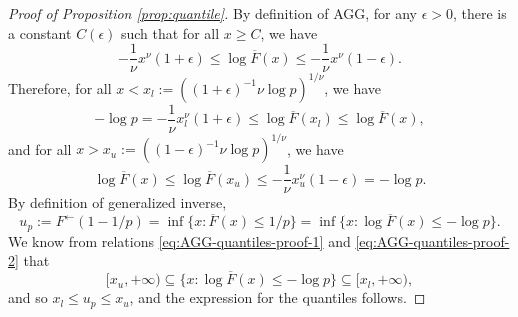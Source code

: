 % 
\begin{proof}[Proof of Proposition \ref{prop:quantile}]
By definition of AGG, for any $\epsilon>0$, there is a constant $C(\epsilon)$ such that for all $x\ge C$, we have
$$
-\frac{1}{\nu}x^\nu(1+\epsilon) \le \log{\overline{F}(x)} \le -\frac{1}{\nu}x^\nu(1-\epsilon).
$$
Therefore, for all $x < x_l := \left((1+\epsilon)^{-1}\nu\log{p}\right)^{1/\nu}$, we have
\begin{equation} \label{eq:AGG-quantiles-proof-1}
    -\log{p} = -\frac{1}{\nu}x_l^\nu(1+\epsilon) \le \log{\overline{F}(x_l)} \le \log{\overline{F}(x)},
\end{equation}
and for all $x > x_u := \left((1-\epsilon)^{-1}\nu\log{p}\right)^{1/\nu}$, we have
\begin{equation} \label{eq:AGG-quantiles-proof-2}
    \log{\overline{F}(x)} \le \log{\overline{F}(x_u)} \le -\frac{1}{\nu}x_u^\nu(1-\epsilon) = -\log{p}.
\end{equation}
By definition of generalized inverse,
\begin{equation*}
    u_p := F^\leftarrow(1-1/p) = \inf\{x:\overline{F}(x)\le 1/p\} = \inf\{x:\log{\overline{F}(x)} \le -\log{p}\}.
\end{equation*}
We know from relations \eqref{eq:AGG-quantiles-proof-1} and \eqref{eq:AGG-quantiles-proof-2} that 
$$
[x_u, +\infty) \subseteq \{x:\log{\overline{F}(x)} \le -\log{p}\} \subseteq [x_l, +\infty),
$$
and so $x_l\le u_p \le x_u$, and the expression for the quantiles follows.
\end{proof}

